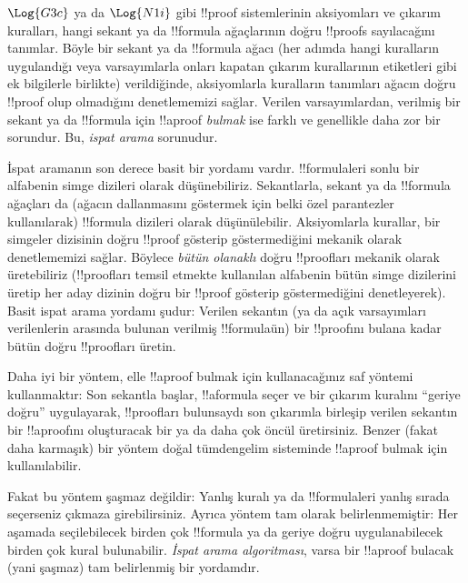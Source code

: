 \documentclass[../../../include/open-logic-section]{subfiles}
\begin{document}


$\Log{G3c}$ ya da $\Log{N1i}$ gibi !!{proof} sistemlerinin aksiyomları ve
çıkarım kuralları, hangi sekant ya da !!{formula} ağaçlarının doğru
!!{proof}s sayılacağını tanımlar. Böyle bir sekant ya da !!{formula} ağacı
(her adımda hangi kuralların uygulandığı veya varsayımlarla onları kapatan
çıkarım kurallarının etiketleri gibi ek bilgilerle birlikte) verildiğinde,
aksiyomlarla kuralların tanımları ağacın doğru !!{proof} olup olmadığını
denetlememizi sağlar. Verilen varsayımlardan, verilmiş bir sekant ya da
!!{formula} için !!a{proof} \emph{bulmak} ise farklı ve genellikle daha zor
bir sorundur. Bu, \emph{ispat arama} sorunudur.

İspat aramanın son derece basit bir yordamı vardır. !!{formula}{}leri sonlu bir
alfabenin simge dizileri olarak düşünebiliriz. Sekantlarla, sekant ya da
!!{formula} ağaçları da (ağacın dallanmasını göstermek için belki özel
parantezler kullanılarak) !!{formula} dizileri olarak düşünülebilir.
Aksiyomlarla kurallar, bir simgeler dizisinin doğru !!{proof} gösterip
göstermediğini mekanik olarak denetlememizi sağlar. Böylece \emph{bütün
olanaklı} doğru !!{proof}{}ları mekanik olarak üretebiliriz (!!{proof}{}ları temsil
etmekte kullanılan alfabenin bütün simge dizilerini üretip her aday dizinin
doğru bir !!{proof} gösterip göstermediğini denetleyerek). Basit ispat arama
yordamı şudur: Verilen sekantın (ya da açık varsayımları verilenlerin
arasında bulunan verilmiş !!{formula}{}ün) bir !!{proof}{}ını bulana kadar bütün
doğru !!{proof}{}ları üretin.

Daha iyi bir yöntem, elle !!a{proof} bulmak için kullanacağınız saf yöntemi
kullanmaktır: Son sekantla başlar, !!a{formula} seçer ve bir çıkarım kuralını
``geriye doğru'' uygulayarak, !!{proof}{}ları bulunsaydı son çıkarımla birleşip
verilen sekantın bir !!a{proof}{}ını oluşturacak bir ya da daha çok öncül
üretirsiniz. Benzer (fakat daha karmaşık) bir yöntem doğal tümdengelim
sisteminde !!a{proof} bulmak için kullanılabilir.

Fakat bu yöntem şaşmaz değildir: Yanlış kuralı ya da !!{formula}{}leri yanlış
sırada seçerseniz çıkmaza girebilirsiniz. Ayrıca yöntem tam olarak
belirlenmemiştir: Her aşamada seçilebilecek birden çok !!{formula} ya da
geriye doğru uygulanabilecek birden çok kural bulunabilir. \emph{İspat arama
algoritması}, varsa bir !!a{proof} bulacak (yani şaşmaz) tam belirlenmiş bir
yordamdır.
\end{document}
